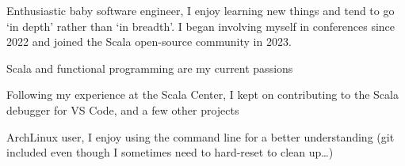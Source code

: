 \begin{MainPart}
  \color{Black}
  \vspace{0.25cm}
  {
    \vspace{-\baselineskip}
    \begin{flushleft}
      Enthusiastic baby software engineer, I enjoy learning new things and tend to go `in depth' rather than `in breadth'. I began involving myself in conferences since 2022 and joined the Scala open-source community in 2023.

      Scala and functional programming are my current passions

      Following my experience at the Scala Center, I kept on contributing to the Scala debugger for VS Code, and a few other projects

      \vspace{\baselineskip}
      ArchLinux user, I enjoy using the command line for a better understanding (git included even though I sometimes need to hard-reset to clean up\dots)
    \end{flushleft}
  }


  \vspace{0.3cm}


\end{MainPart}
